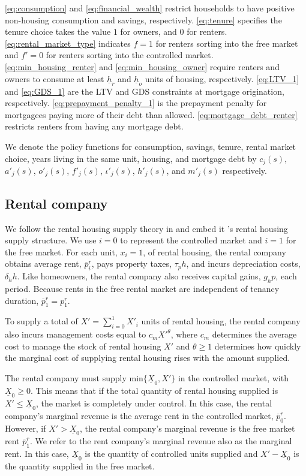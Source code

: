 \documentclass[parskip=full]{article}
\begin{document}
\ref{eq:consumption} and \ref{eq:financial_wealth} restrict households to have positive non-housing consumption and savings, respectively. \ref{eq:tenure} specifies the tenure choice takes the value $1$ for owners, and $0$ for renters. \ref{eq:rental_market_type} indicates $f=1$ for renters sorting into the free market and $f'=0$ for renters sorting into the controlled market. \ref{eq:min_housing_renter} and \ref{eq:min_housing_owner} require renters and owners to consume at least $\underline{h}_{r}$ and $\underline{h}_{o}$ units of housing, respectively. \ref{eq:LTV_1} and \ref{eq:GDS_1} are the LTV and GDS constraints at mortgage origination, respectively. \ref{eq:prepayment_penalty_1} is the prepayment penalty for mortgagees paying more of their debt than allowed. \ref{eq:mortgage_debt_renter} restricts renters from having any mortgage debt. 

We denote the policy functions for consumption, savings, tenure, rental market choice, years living in the same unit, housing, and mortgage debt by $c_{j}(s)$, $a'_{j}(s)$, $o'_{j}(s)$, $f'_{j}(s)$, $\iota'_{j}(s)$, $h'_{j}(s)$, and $m'_{j}(s)$ respectively.

\subsection{Rental company}\label{sec:rental_company}

We follow the rental housing supply theory in \citet{fallis-1985} and embed it \citet{garrigaeetal-2009}'s rental housing supply structure. We use $i=0$ to represent the controlled market and $i=1$ for the free market. For each unit, $x_{i}=1$, of rental housing, the rental company obtains average rent, $\overline{p}^{r}_{i}$, pays property taxes, $\tau_{p}h$, and incurs depreciation costs, $\delta_{h}h$. Like homeowners, the rental company also receives capital gains, $g_{h}p$, each period. Because rents in the free rental market are independent of tenancy duration, $\overline{p}^{r}_{1}=p^{r}_{1}$. 

To supply a total of $X'=\sum^{1}_{i=0} X'_{i}$ units of rental housing, the rental company also incurs management costs equal to $c_{m}X'^{\theta}$, where $c_{m}$ determines the average cost to manage the stock of rental housing $X'$ and $\theta\geq 1$ determines how quickly the marginal cost of supplying rental housing rises with the amount supplied. 

The rental company must supply $\mbox{min}\{\underline{X}_{0},X'\}$ in the controlled market, with $\underline{X}_{0} \geq 0$. This means that if the total quantity of rental housing supplied is $X'\leq \underline{X}_{0}$, the market is completely under control. In this case, the rental company's marginal revenue is the average rent in the controlled market, $\overline{p}^{r}_{0}$. However, if $X'>\underline{X}_{0}$, the rental company's marginal revenue is the free market rent $\overline{p}^{r}_{1}$. We refer to the rent company's marginal revenue also as the marginal rent. In this case, $\underline{X}_{0}$ is the quantity of controlled units supplied and $X'-\underline{X}_{0}$ is the quantity supplied in the free market.
\end{document}
